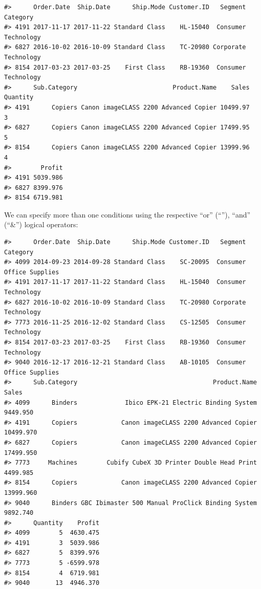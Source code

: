 \documentclass[]{article}
\newenvironment{Shaded}{\begin{snugshade}}{\end{snugshade}}
\newcommand{\DecValTok}[1]{\textcolor[rgb]{0.00,0.00,0.81}{#1}}
\newcommand{\NormalTok}[1]{#1}
\newcommand{\OperatorTok}[1]{\textcolor[rgb]{0.81,0.36,0.00}{\textbf{#1}}}
\newcommand{\StringTok}[1]{\textcolor[rgb]{0.31,0.60,0.02}{#1}}
\begin{document}
\begin{verbatim}
#>      Order.Date  Ship.Date      Ship.Mode Customer.ID   Segment   Category
#> 4191 2017-11-17 2017-11-22 Standard Class    HL-15040  Consumer Technology
#> 6827 2016-10-02 2016-10-09 Standard Class    TC-20980 Corporate Technology
#> 8154 2017-03-23 2017-03-25    First Class    RB-19360  Consumer Technology
#>      Sub.Category                          Product.Name    Sales Quantity
#> 4191      Copiers Canon imageCLASS 2200 Advanced Copier 10499.97        3
#> 6827      Copiers Canon imageCLASS 2200 Advanced Copier 17499.95        5
#> 8154      Copiers Canon imageCLASS 2200 Advanced Copier 13999.96        4
#>        Profit
#> 4191 5039.986
#> 6827 8399.976
#> 8154 6719.981
\end{verbatim}

We can specify more than one conditions using the respective ``or''
(``\textbar{}''), ``and'' (``\&'') logical operators:

\begin{Shaded}
\end{Shaded}

\begin{verbatim}
#>      Order.Date  Ship.Date      Ship.Mode Customer.ID   Segment        Category
#> 4099 2014-09-23 2014-09-28 Standard Class    SC-20095  Consumer Office Supplies
#> 4191 2017-11-17 2017-11-22 Standard Class    HL-15040  Consumer      Technology
#> 6827 2016-10-02 2016-10-09 Standard Class    TC-20980 Corporate      Technology
#> 7773 2016-11-25 2016-12-02 Standard Class    CS-12505  Consumer      Technology
#> 8154 2017-03-23 2017-03-25    First Class    RB-19360  Consumer      Technology
#> 9040 2016-12-17 2016-12-21 Standard Class    AB-10105  Consumer Office Supplies
#>      Sub.Category                                     Product.Name     Sales
#> 4099      Binders             Ibico EPK-21 Electric Binding System  9449.950
#> 4191      Copiers            Canon imageCLASS 2200 Advanced Copier 10499.970
#> 6827      Copiers            Canon imageCLASS 2200 Advanced Copier 17499.950
#> 7773     Machines        Cubify CubeX 3D Printer Double Head Print  4499.985
#> 8154      Copiers            Canon imageCLASS 2200 Advanced Copier 13999.960
#> 9040      Binders GBC Ibimaster 500 Manual ProClick Binding System  9892.740
#>      Quantity    Profit
#> 4099        5  4630.475
#> 4191        3  5039.986
#> 6827        5  8399.976
#> 7773        5 -6599.978
#> 8154        4  6719.981
#> 9040       13  4946.370
\end{verbatim}
\end{document}
